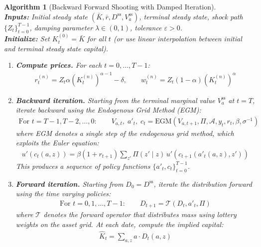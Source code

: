 \documentclass[12pt]{article}
\newtheorem{algorithm_env}{Algorithm}
\begin{document}
\begin{algorithm_env}[Backward Forward Shooting with Damped Iteration]
\label{algo:shooting}
\mbox{} \\
\textbf{Inputs:} Initial steady state $(\bar{K}, \bar{r}, D^{\text{ss}}, V_a^{\text{ss}})$, terminal steady state, shock path $\{Z_t\}_{t=0}^{T-1}$, damping parameter $\lambda \in (0,1)$, tolerance $\varepsilon > 0$. \\[6pt]
\textbf{Initialize:} Set $K^{(0)}_t = \bar{K}$ for all $t$ (or use linear interpolation between initial and terminal steady state capital).
\begin{enumerate}[label=\textbf{Step \arabic*.}, leftmargin=2.5cm]
    \item \textbf{Compute prices.} For each $t = 0, \ldots, T-1$:
    \begin{align*}
        r^{(n)}_t = Z_t \alpha \left(K^{(n)}_t\right)^{\alpha - 1} - \delta, \qquad w^{(n)}_t = Z_t (1 - \alpha) \left(K^{(n)}_t\right)^{\alpha}
    \end{align*}

    \item \textbf{Backward iteration.} Starting from the terminal marginal value $V_a^{\text{ss}}$ at $t = T$, iterate backward using the Endogenous Grid Method (EGM):
    \begin{align*}
        \text{For } t = T-1, T-2, \ldots, 0: \qquad V_{a,t}, \; a'_t, \; c_t = \text{EGM}\left(V_{a,t+1}, \Pi, \mathcal{A}, y_t, r_t, \beta, \sigma^{-1}\right)
    \end{align*}
    where EGM denotes a single step of the endogenous grid method, which exploits the Euler equation:
    \begin{align}
        u'(c_t(a, z)) = \beta (1 + r_{t+1}) \sum_{z'} \Pi(z' \mid z) \, u'(c_{t+1}(a'_t(a,z), z')) \label{eq:euler_transition}
    \end{align}
    This produces a sequence of policy functions $\{a'_t, c_t\}_{t=0}^{T-1}$.

    \item \textbf{Forward iteration.} Starting from $D_0 = D^{\text{ss}}$, iterate the distribution forward using the time varying policies:
    \begin{align*}
        \text{For } t = 0, 1, \ldots, T-1: \qquad D_{t+1} = \mathcal{T}(D_t, a'_t, \Pi)
    \end{align*}
    where $\mathcal{T}$ denotes the forward operator that distributes mass using lottery weights on the asset grid. At each date, compute the implied capital:
    \begin{align}
        \hat{K}_t = \sum_{a,z} a \cdot D_t(a, z) \label{eq:K_implied}
    \end{align}


\end{enumerate}
\end{algorithm_env}
\end{document}
